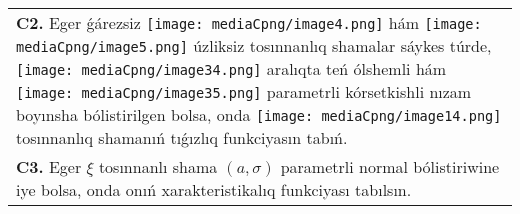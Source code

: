 \documentclass{article}
\begin{document}
\begin{tabular}{m{17cm}}
 \\
\textbf{C2.} Eger ǵárezsiz \texttt{[image: mediaCpng/image4.png]} hám \texttt{[image: mediaCpng/image5.png]} úzliksiz tosınnanlıq shamalar sáykes túrde, \texttt{[image: mediaCpng/image34.png]} aralıqta teń ólshemli hám \texttt{[image: mediaCpng/image35.png]} parametrli kórsetkishli nızam boyınsha bólistirilgen bolsa, onda \texttt{[image: mediaCpng/image14.png]} tosınnanlıq shamanıń tıǵızlıq funkciyasın tabıń.
 \\
\textbf{C3.} Eger \(\xi\) tosınnanlı shama \((a,\sigma)\) parametrli normal bólistiriwine iye bolsa, onda onıń xarakteristikalıq funkciyası tabılsın.
 \\

\end{tabular}
\vspace{1cm}
\end{document}
